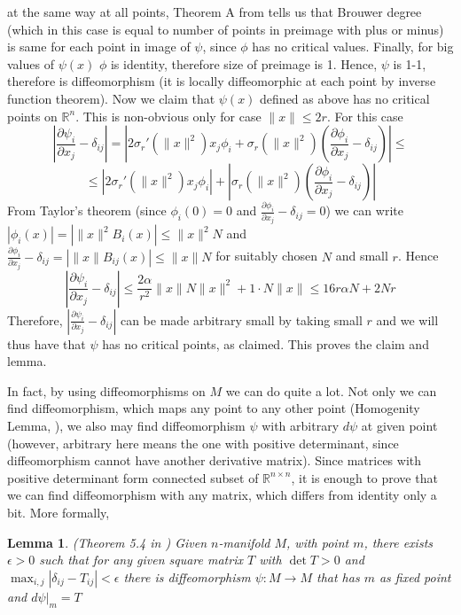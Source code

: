 \documentclass[8pt]{article} %
\newcommand{\norm}[1]{\|#1\|}
\newtheorem{lemma}[theorem]{Lemma}
\newenvironment{proof}[1][Proof]{\begin{trivlist}
\item[\hskip \labelsep {\bfseries #1}]}{\qed\end{trivlist}}
\newcommand{\qed}{\nobreak \ifvmode \relax \else
\ifdim\lastskip<1.5em \hskip-\lastskip
\hskip1.5em plus0em minus0.5em \fi \nobreak
  \vrule height0.75em width0.5em depth0.25em\fi}
\begin{document}
\begin{proof}
at the same way at all points, Theorem A from \cite[p. 28]{diffTopo} tells us that Brouwer degree (which in this case is equal to number
of points in preimage with plus or minus) is same for each point in image of $\psi$, since $\phi$ has no critical values. Finally, for big values
of $\psi(x)$ $\phi$ is identity, therefore size of preimage is 1. Hence, $\psi$ is 1-1, therefore is diffeomorphism (it is locally diffeomorphic
at each point by inverse function theorem).
Now we claim that $\psi(x)$ defined as above has no critical points on $\mathbb{R}^n$. This is non-obvious only for case $\norm{x}\leq 2r$. For this case
\[|\frac{\partial \psi_i}{\partial x_j}-\delta_{ij}|=
|2\sigma_r'(\|x\|^2)x_j\phi_i+\sigma_r(\norm{x}^2)(\frac{\partial \phi_i}{\partial x_j}-\delta_{ij})|\leq\]
\[\leq |2\sigma_r'(\|x\|^2)x_j\phi_i|+|\sigma_r(\norm{x}^2)(\frac{\partial \phi_i}{\partial x_j}-\delta_{ij})|\]
From Taylor's theorem (since $\phi_i(0)=0$ and $\frac{\partial\phi_i}{\partial x_j}-\delta_{ij}=0$) we can write
$|\phi_i(x)|=|\norm{x}^2B_i(x)|\leq \norm{x}^2N$ and $\frac{\partial\phi_i}{\partial x_j}-\delta_{ij}=|\norm{x}B_{ij}(x)|\leq \norm{x}N$ for
suitably chosen $N$ and small $r$. Hence
\[|\frac{\partial \psi_i}{\partial x_j}-\delta_{ij}|\leq \frac{2\alpha}{r^2}\norm{x}N\norm{x}^2+1\cdot N\norm{x}\leq 16r\alpha N+2Nr\]
Therefore, $|\frac{\partial \psi_i}{\partial x_j}-\delta_{ij}|$ can be made arbitrary small by taking small $r$ and we will thus have
that $\psi$ has no critical points, as claimed. This proves the claim and lemma.
\end{proof}
In fact, by using diffeomorphisms on $M$ we can do quite a lot. Not only we can find diffeomorphism, which maps any point to any other point
(Homogenity Lemma, \cite[p. 22]{diffTopo}), we also may find diffeomorphism $\psi$ with arbitrary $d\psi$ at given point (however, arbitrary
here means the one with positive determinant, since diffeomorphism cannot have another derivative matrix). Since matrices with positive
determinant form connected subset of $\mathbb{R}^{n\times n}$, it is enough to prove that we can find diffeomorphism with any matrix, which
differs from identity only a bit. More formally,
\begin{lemma}{(Theorem 5.4 in \cite{palaisInner}) }
	\label{rotationDiffm}
	Given $n$-manifold $M$, with point $m$, there exists $\epsilon>0$ such that for any given square matrix $T$ with $\det T>0$ and
	$\max_{i,j}|\delta_{ij}-T_{ij}|<\epsilon$ there is diffeomorphism $\psi:M\rightarrow M$ that has $m$ as fixed point and $d\psi|_m=T$
\end{lemma}
\end{document}
